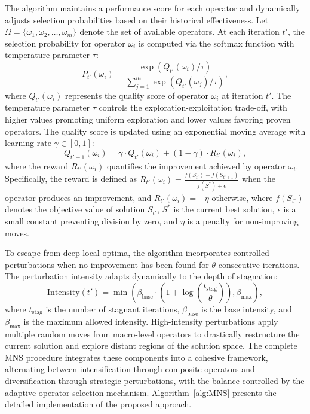 \documentclass[preprint,12pt,authoryear]{elsarticle}
\theoremstyle{definition}
\begin{document}
The algorithm maintains a performance score for each operator and dynamically adjusts selection probabilities based on their historical effectiveness. Let $\Omega = \{\omega_1, \omega_2, \ldots, \omega_m\}$ denote the set of available operators. At each iteration ${t'}$, the selection probability for operator $\omega_i$ is computed via the softmax function with temperature parameter $\tau$:
\begin{equation}
P_{t'}(\omega_i) = \frac{\exp(Q_{t'}(\omega_i)/\tau)}{\sum_{j=1}^{m} \exp(Q_{t'}(\omega_j)/\tau)},
\end{equation}
where $Q_{t'}(\omega_i)$ represents the quality score of operator $\omega_i$ at iteration ${t'}$. The temperature parameter $\tau$ controls the exploration-exploitation trade-off, with higher values promoting uniform exploration and lower values favoring proven operators. The quality score is updated using an exponential moving average with learning rate $\gamma \in [0,1]$:
\begin{equation}
Q_{{t'}+1}(\omega_i) = \gamma \cdot Q_{t'}(\omega_i) + (1-\gamma) \cdot R_{t'}(\omega_i),
\end{equation}
where the reward $R_{t'}(\omega_i)$ quantifies the improvement achieved by operator $\omega_i$. Specifically, the reward is defined as $R_{t'}(\omega_i) = \frac{f(S_{t'}) - f(S_{{t'}+1})}{f(S^*) + \epsilon}$ when the operator produces an improvement, and $R_{t'}(\omega_i) = -\eta$ otherwise, where $f(S_{t'})$ denotes the objective value of solution $S_{t'}$, $S^*$ is the current best solution, $\epsilon$ is a small constant preventing division by zero, and $\eta$ is a penalty for non-improving moves.

To escape from deep local optima, the algorithm incorporates controlled perturbations when no improvement has been found for $\theta$ consecutive iterations. The perturbation intensity adapts dynamically to the depth of stagnation:
\begin{equation}
\text{Intensity}({t'}) = \min\left(\beta_{\text{base}} \cdot \left(1 + \log\left(\frac{t_{\text{stag}}}{\theta}\right)\right), \beta_{\text{max}}\right),
\end{equation}
where $t_{\text{stag}}$ is the number of stagnant iterations, $\beta_{\text{base}}$ is the base intensity, and $\beta_{\text{max}}$ is the maximum allowed intensity. High-intensity perturbations apply multiple random moves from macro-level operators to drastically restructure the current solution and explore distant regions of the solution space. The complete MNS procedure integrates these components into a cohesive framework, alternating between intensification through composite operators and diversification through strategic perturbations, with the balance controlled by the adaptive operator selection mechanism. Algorithm~\ref{alg:MNS} presents the detailed implementation of the proposed approach.
\end{document}
